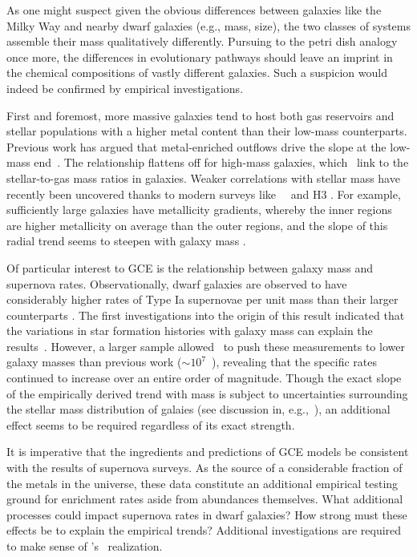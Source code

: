 \documentclass[main.tex]{subfiles}
\begin{document}
\begin{doublespace}
As one might suspect given the obvious differences between galaxies like the
Milky Way and nearby dwarf galaxies (e.g., mass, size), the two classes of
systems assemble their mass qualitatively differently.
Pursuing to the petri dish analogy once more, the differences in evolutionary
pathways should leave an imprint in the chemical compositions of vastly
different galaxies.
Such a suspicion would indeed be confirmed by empirical investigations.
\par
First and foremost, more massive galaxies tend to host both gas reservoirs
\citep{Tremonti2004, Zahid2011, Zahid2012, Andrews2013} and stellar populations
\citep{Gallazzi2005, Kirby2013} with a higher metal content than their low-mass
counterparts.
Previous work has argued that metal-enriched outflows drive the slope at the
low-mass end~\citep{Finlator2008, Peeples2011, Chisholm2018}.
The relationship flattens off for high-mass galaxies, which~\citet{Zahid2014}
link to the stellar-to-gas mass ratios in galaxies.
Weaker correlations with stellar mass have recently been uncovered thanks to
modern surveys like~\gaia~\citep{GaiaCollaboration2016} and H3
\citep{Conroy2019}.
For example, sufficiently large galaxies have metallicity gradients, whereby
the inner regions are higher metallicity on average than the outer regions,
and the slope of this radial trend seems to steepen with galaxy mass
\citep[e.g.,][]{Goddard2017}.
\par
Of particular interest to GCE is the relationship between galaxy mass and
supernova rates.
Observationally, dwarf galaxies are observed to have considerably higher rates
of Type Ia supernovae per unit mass than their larger counterparts
\citep[e.g.,][]{Leaman2011, Li2011}.
The first investigations into the origin of this result indicated that the
variations in star formation histories with galaxy mass can explain the
results~\citep[e.g.,][]{Graur2013, Graur2015}.
However, a larger sample allowed~\citet{Brown2019} to push these measurements
to lower galaxy masses than previous work ($\sim$$10^7$~\msun), revealing that
the specific rates continued to increase over an entire order of magnitude.
Though the exact slope of the empirically derived trend with mass is subject to
uncertainties surrounding the stellar mass distribution of galaies (see
discussion in, e.g.,~\citealt{Gandhi2022}), an additional effect seems to be
required regardless of its exact strength.
\par
It is imperative that the ingredients and predictions of GCE models be
consistent with the results of supernova surveys.
As the source of a considerable fraction of the metals in the universe, these
data constitute an additional empirical testing ground for enrichment rates
aside from abundances themselves.
What additional processes could impact supernova rates in dwarf galaxies?
How strong must these effects be to explain the empirical trends?
Additional investigations are required to make sense of
\citet{Brown2019}'s~\citeyearpar{Brown2019} realization.


\end{doublespace}
\end{document}
